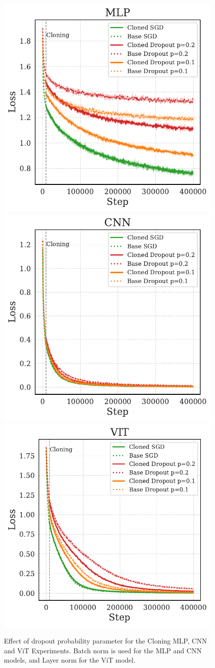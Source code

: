 \documentclass{article}
\numberwithin{figure}{section}
\begin{document}
\begin{figure}
    \centering
    \includegraphics[width=0.3\linewidth]{paper/images/mlp_dropout_cloning_losses_plot.pdf}
    \includegraphics[width=0.3\linewidth]{paper/images/cnn_dropout_cloning_losses_plot.pdf}
    \includegraphics[width=0.3\linewidth]{paper/images/vit_dropout_cloning_losses_plot.pdf}
    \caption{Effect of dropout probability parameter for the Cloning MLP, CNN and ViT Experiments. Batch norm is used for the MLP and CNN models, and Layer norm for the ViT model.}
    \label{fig:enter-label}
\end{figure}
\end{document}
